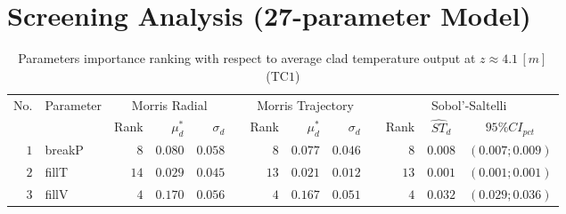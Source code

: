 \section{Screening Analysis (27-parameter Model)}\label{app:tbl_results_screening}

\begin{table*}[!htbp]\centering
{}
\caption{Parameters importance ranking with respect to average clad temperature output at $z \approx 4.1 \, [m]$ (TC$1$)}
\label{tab:app_screening_tc1_average}
\begin{tabular}{@{}rlrrrrrrrrrcc@{}}\toprule
\multirow{2}{*}{\footnotesize{No.}} & \multirow{2}{*}{\footnotesize{Parameter}} & \multicolumn{3}{c}{\footnotesize{Morris Radial}} & \phantom{a} & \multicolumn{3}{c}{\footnotesize{Morris Trajectory}}  &\phantom{a}& \multicolumn{3}{c}{\footnotesize{Sobol'-Saltelli}}                               \\             
                                                                                  \cmidrule{3-5}                                                   \cmidrule{7-9}                                                      \cmidrule{11-13}
                                    &                                           & \footnotesize{Rank}   & $\mu^*_d$ & $\sigma_d$   &             & \footnotesize{Rank} & $\mu^*_d$ & $\sigma_d$          &           & \footnotesize{Rank} & \footnotesize{$\hat{ST}_d$} & \footnotesize{$95\%CI_{pct}$}\\ \midrule
\footnotesize{$1 $} & \footnotesize{breakP   } & \footnotesize{$8 $} & \footnotesize{$0.080$} & \footnotesize{$0.058$} && \footnotesize{$8 $} & \footnotesize{$0.077$} & \footnotesize{$0.046$} && \footnotesize{$8 $} & \footnotesize{$0.008$} & \footnotesize{$(0.007;0.009)$} \\
\footnotesize{$2 $} & \footnotesize{fillT    } & \footnotesize{$14$} & \footnotesize{$0.029$} & \footnotesize{$0.045$} && \footnotesize{$13$} & \footnotesize{$0.021$} & \footnotesize{$0.012$} && \footnotesize{$13$} & \footnotesize{$0.001$} & \footnotesize{$(0.001;0.001)$} \\
\footnotesize{$3 $} & \footnotesize{fillV    } & \footnotesize{$4 $} & \footnotesize{$0.170$} & \footnotesize{$0.056$} && \footnotesize{$4 $} & \footnotesize{$0.167$} & \footnotesize{$0.051$} && \footnotesize{$4 $} & \footnotesize{$0.032$} & \footnotesize{$(0.029;0.036)$} \\

\end{tabular}
\end{table*}
